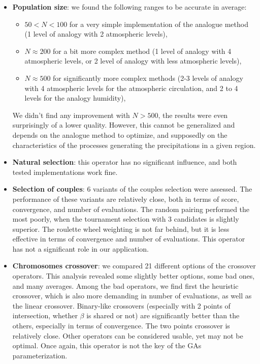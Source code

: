 \documentclass[twocol]{ametsoc}
\begin{document}
\begin{itemize}
	\item \textbf{Population size}: we found the following ranges to be accurate in average:
	\begin{itemize}
		\item $50<N<100$ for a very simple implementation of the analogue method (1 level of analogy with 2 atmospheric levels),
		
		\item $N\approx200$ for a bit more complex method (1 level of analogy with 4 atmospheric levels, or 2 level of analogy with less atmospheric levels),
		
		\item $N\approx500$ for significantly more complex methods (2-3 levels of analogy with 4 atmospheric levels for the atmospheric circulation, and 2 to 4 levels for the analogy humidity),
	\end{itemize}
	We didn't find any improvement with $N>500$, the results were even surprisingly of a lower quality. However, this cannot be generalized and depends on the analogue method to optimize, and supposedly on the characteristics of the processes generating the precipitations in a given region. 
	
	\item \textbf{Natural selection}: this operator has no significant influence, and both tested implementations work fine.
	
	\item \textbf{Selection of couples}: 6 variants of the couples selection were assessed. The performance of these variants are relatively close, both in terms of score, convergence, and number of evaluations. The random pairing performed the most poorly, when the tournament selection with 3 candidates is slightly superior. The roulette wheel weighting is not far behind, but it is less effective in terms of convergence and number of evaluations. This operator has not a significant role in our application. 
	
	\item \textbf{Chromosomes crossover}: we compared 21 different options of the crossover operators. This analysis revealed some slightly better options, some bad ones, and many averages. Among the bad operators, we find first the heuristic crossover, which is also more demanding in number of evaluations, as well as the linear crossover. Binary-like crossovers (especially with 2 points of intersection, whether $\beta$ is shared or not) are significantly better than the others, especially in terms of convergence. The two points crossover is relatively close. Other operators can be considered usable, yet may not be optimal. Once again, this operator is not the key of the GAs parameterization.
	

\end{itemize}
\end{document}
